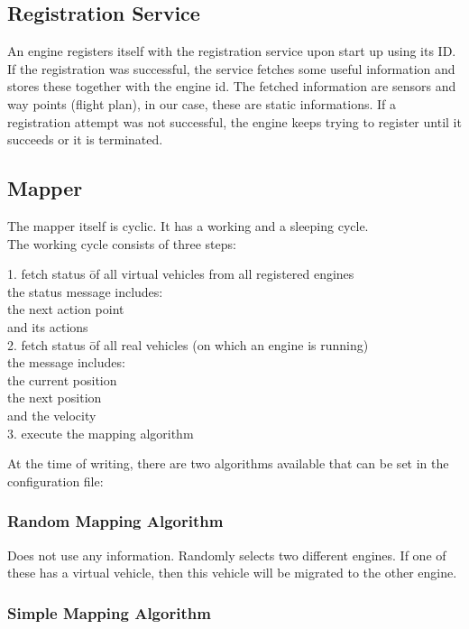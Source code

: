 \subsection{Registration Service}
An engine registers itself with the registration service upon start up using its ID. If the registration was successful, the service
fetches some useful information and stores these together with the engine id. The fetched information are sensors and 
way points (flight plan), in our case, these are static informations. If a registration attempt was not successful, the engine 
keeps trying to register until it succeeds or it is terminated.

\subsection{Mapper}
The mapper itself is cyclic. It has a working and a sleeping cycle. \\
The working cycle consists of three steps:
\begin{tabbing}
1. fetch status \= of all virtual vehicles from all registered engines \\
\>	the status message includes: \= \\ 
\> \>					the next action point \\ 
\> \>					and its actions \\[0.25cm]
2. fetch status \= of all real vehicles (on which an engine is running) \\
\>	the message includes:  \\
\> \>				the current position \\
\> \> 				the next position \\
\> \>				and the velocity \\[0.25cm]
3. execute the mapping algorithm \\
\end{tabbing}
At the time of writing, there are two algorithms available that can be set in the configuration file:
\subsubsection{Random Mapping Algorithm}
Does not use any information. Randomly selects two different engines. If one of these has a virtual vehicle, then this vehicle 
will be migrated to the other engine.

\subsubsection{Simple Mapping Algorithm}

